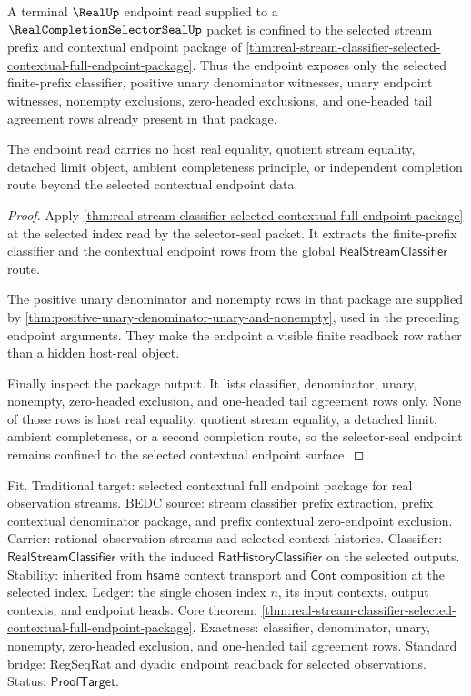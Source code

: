 \begin{theorem}
\label{thm:real-stream-selector-seal-endpoint-route}
A terminal $\RealUp$ endpoint read supplied to a $\RealCompletionSelectorSealUp$ packet is confined to the selected stream prefix and contextual endpoint package of \autoref{thm:real-stream-classifier-selected-contextual-full-endpoint-package}. Thus the endpoint exposes only the selected finite-prefix classifier, positive unary denominator witnesses, unary endpoint witnesses, nonempty exclusions, zero-headed exclusions, and one-headed tail agreement rows already present in that package.

The endpoint read carries no host real equality, quotient stream equality, detached limit object, ambient completeness principle, or independent completion route beyond the selected contextual endpoint data.
\end{theorem}
\begin{proof}
Apply \autoref{thm:real-stream-classifier-selected-contextual-full-endpoint-package} at the selected index read by the selector-seal packet. It extracts the finite-prefix classifier and the contextual endpoint rows from the global $\mathsf{RealStreamClassifier}$ route.

The positive unary denominator and nonempty rows in that package are supplied by \autoref{thm:positive-unary-denominator-unary-and-nonempty}, used in the preceding endpoint arguments. They make the endpoint a visible finite readback row rather than a hidden host-real object.

Finally inspect the package output. It lists classifier, denominator, unary, nonempty, zero-headed exclusion, and one-headed tail agreement rows only. None of those rows is host real equality, quotient stream equality, a detached limit, ambient completeness, or a second completion route, so the selector-seal endpoint remains confined to the selected contextual endpoint surface.
\end{proof}

Fit. Traditional target: selected contextual full endpoint package for real
observation streams. BEDC source: stream classifier prefix extraction, prefix
contextual denominator package, and prefix contextual zero-endpoint exclusion.
Carrier: rational-observation streams and selected context histories.
Classifier: $\mathsf{RealStreamClassifier}$ with the induced
$\mathsf{RatHistoryClassifier}$ on the selected outputs. Stability: inherited
from $\mathsf{hsame}$ context transport and $\mathsf{Cont}$ composition at the
selected index. Ledger: the single chosen index $n$, its input contexts, output
contexts, and endpoint heads. Core theorem:
\autoref{thm:real-stream-classifier-selected-contextual-full-endpoint-package}.
Exactness: classifier, denominator, unary, nonempty, zero-headed exclusion, and
one-headed tail agreement rows. Standard bridge: RegSeqRat and dyadic endpoint
readback for selected observations. Status: $\mathsf{ProofTarget}$.
